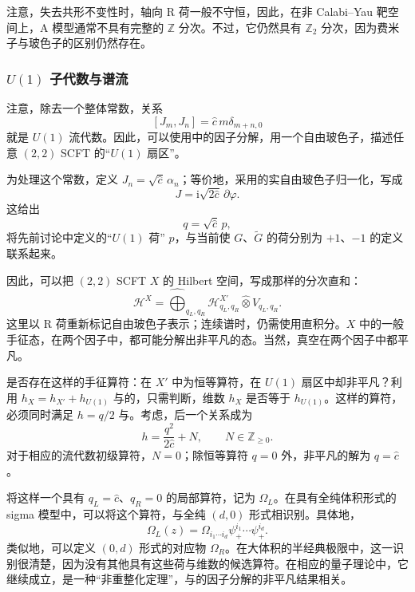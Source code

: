 注意，失去共形不变性时，轴向 R 荷一般不守恒，因此，在非 Calabi--Yau 靶空间上，A 模型通常不具有完整的 $\mathbb{Z}$ 分次。不过，它仍然具有 $\mathbb{Z}_2$ 分次，因为费米子与玻色子的区别仍然存在。

\subsubsection{\texorpdfstring{$U(1)$}{U(1)} 子代数与谱流}\label{sec:3.3.4.6}

注意，除去一个整体常数，关系
\[
[J_m,J_n]=\widehat c\,m\delta_{m+n,0}
\]
就是 $U(1)$ 流代数。因此，可以使用中的因子分解，用一个自由玻色子，描述任意 $(2,2)$ SCFT 的“$U(1)$ 扇区”。

为处理这个常数，定义 $J_n=\sqrt{\widehat c}\,\alpha_n$；等价地，采用的实自由玻色子归一化，写成
\begin{equation}\label{eq:3.102}
J=\mathrm{i}\sqrt{2\widehat c}\,\partial\varphi.
\end{equation}
这给出
\begin{equation}\label{eq:3.103}
q=\sqrt{\widehat c}\,p,
\end{equation}
将先前讨论中定义的“$U(1)$ 荷” $p$，与当前使 $G$、$\widetilde G$ 的荷分别为 $+1$、$-1$ 的定义联系起来。

因此，可以把 $(2,2)$ SCFT $X$ 的 Hilbert 空间，写成那样的分次直和：
\[
\mathcal{H}^X=\widehat{\bigoplus}_{q_L,q_R}
\mathcal{H}^{X'}_{q_L,q_R}\widehat\otimes V_{q_L,q_R}.
\]
这里以 R 荷重新标记自由玻色子表示；连续谱时，仍需使用直积分。$X$ 中的一般手征态，在两个因子中，都可能分解出非平凡的态。当然，真空在两个因子中都平凡。

是否存在这样的手征算符：在 $X'$ 中为恒等算符，在 $U(1)$ 扇区中却非平凡？利用 $h_X=h_{X'}+h_{U(1)}$ 与的，只需判断，维数 $h_X$ 是否等于 $h_{U(1)}$。这样的算符，必须同时满足 $h=q/2$ 与。考虑，后一个关系成为
\[
h=\frac{q^2}{2\widehat c}+N,
\qquad N\in\mathbb{Z}_{\ge0}.
\]
对于相应的流代数初级算符，$N=0$；除恒等算符 $q=0$ 外，非平凡的解为 $q=\widehat c$。

将这样一个具有 $q_L=\widehat c$、$q_R=0$ 的局部算符，记为 $\Omega_L$。在具有全纯体积形式的 sigma 模型中，可以将这个算符，与全纯 $(d,0)$ 形式相识别。具体地，
\begin{equation}\label{eq:3.104}
\Omega_L(z)=\Omega_{i_1\cdots i_d}
\psi_+^{i_1}\cdots\psi_+^{i_d}.
\end{equation}
类似地，可以定义 $(0,d)$ 形式的对应物 $\Omega_R$。在大体积的半经典极限中，这一识别很清楚，因为没有其他具有这些荷与维数的候选算符。在相应的量子理论中，它继续成立，是一种“非重整化定理”，与的因子分解的非平凡结果相关。

